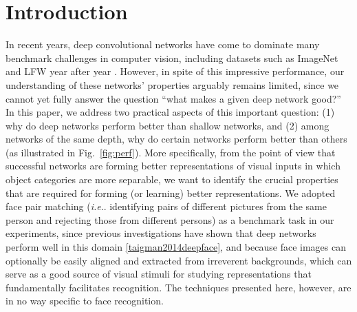 \documentclass[fleqn]{article} %
\makeatletter
\DeclareRobustCommand\onedot{\futurelet\@let@token\@onedot}
\def\@onedot{\ifx\@let@token.\else.\null\fi\xspace}
\def\ie{\emph{i.e}\onedot} \def\Ie{\emph{I.e}\onedot}
\makeatother
\begin{document}
\section{Introduction}

\newcommand{\expwhyface}{Nevertheless, the methods and most observations presented in this work are in general not limited to just face pair matching, and may be generalized onto other domains in visual recognition.}

In recent years, deep convolutional networks have come to dominate many benchmark challenges in computer vision, including datasets such as ImageNet \cite{russakovsky2014imagenet} and LFW \cite{LFWTech} year after year \cite{krizhevsky2012imagenet, sermanet2013overfeat, szegedy2014going, taigman2014deepface, sun2014deep, schroff2015facenet}.  However, in spite of this impressive performance, our understanding of these networks' properties arguably remains limited, since we cannot yet fully answer the question ``what makes a given deep network good?''
In this paper, we address two practical aspects of this important question: (1) why do deep networks perform better than shallow networks, and (2) among networks of the same depth, why do certain networks perform better than others (as illustrated in Fig.~\ref{fig:perf}).
More specifically, from the point of view that successful networks are forming better representations of visual inputs in which object categories are more separable, we want to identify the crucial properties that are required for forming (or learning) better representations. 
We adopted face pair matching (\ie identifying pairs of different pictures from the same person and rejecting those from different persons) as a benchmark task in our experiments, since previous investigations have shown that deep networks perform well in this domain \ref{taigman2014deepface}, and because face images can optionally be easily aligned and extracted from irreverent backgrounds, which can serve as a good source of visual stimuli for studying representations that fundamentally facilitates recognition.  The techniques presented here, however, are in no way specific to face recognition.

\end{document}
